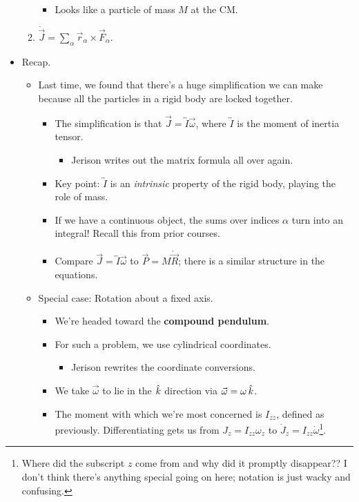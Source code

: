\documentclass[../notes.tex]{subfiles}
\begin{document}
\begin{itemize}
\begin{enumerate}
\begin{itemize}
            \item Looks like a particle of mass $M$ at the CM.
        \end{itemize}
        \item $\dot{\vec{J}}=\sum_\alpha\vec{r}_\alpha\times\vec{F}_\alpha$.
    \end{enumerate}
    \item Recap.
    \begin{itemize}
        \item Last time, we found that there's a huge simplification we can make because all the particles in a rigid body are locked together.
        \begin{itemize}
            \item The simplification is that $\vec{J}=\overleftrightarrow{I}\vec{\omega}$, where $\overleftrightarrow{I}$ is the moment of inertia tensor.
            \begin{itemize}
                \item Jerison writes out the matrix formula all over again.
            \end{itemize}
            \item Key point: $\overleftrightarrow{I}$ is an \emph{intrinsic} property of the rigid body, playing the role of mass.
            \item If we have a continuous object, the sums over indices $\alpha$ turn into an integral! Recall this from prior courses.
            \item Compare $\vec{J}=\overleftrightarrow{I}\vec{\omega}$ to $\vec{P}=M\dot{\vec{R}}$; there is a similar structure in the equations.
        \end{itemize}
        \item Special case: Rotation about a fixed axis.
        \begin{itemize}
            \item We're headed toward the \textbf{compound pendulum}.
            \item For such a problem, we use cylindrical coordinates.
            \begin{itemize}
                \item Jerison rewrites the coordinate conversions.
            \end{itemize}
            \item We take $\vec{\omega}$ to lie in the $\hat{k}$ direction via $\vec{\omega}=\omega\,\hat{k}$.
            \item The moment with which we're most concerned is $I_{zz}$, defined as previously. Differentiating gets us from $J_z=I_{zz}\omega_z$ to $\dot{J}_z=I_{zz}\dot{\omega}$\footnote{Where did the subscript $z$ come from and why did it promptly disappear?? I don't think there's anything special going on here; notation is just wacky and confusing.}.

\end{itemize}
\end{itemize}
\end{itemize}
\end{document}
